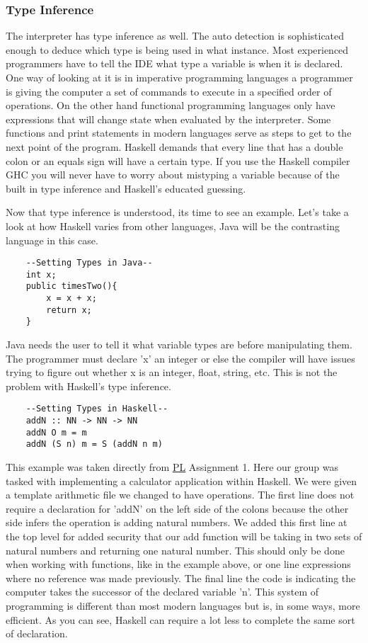 \documentclass{article}
\begin{document}
    \subsubsection{Type Inference}
    The interpreter has type inference as well. The auto detection is sophisticated enough to deduce which type is being used in what instance. Most experienced programmers have to tell the IDE what type a variable is when it is declared. One way of looking at it is in imperative programming languages a programmer is giving the computer a set of commands to execute in a specified order of operations. On the other hand functional programming languages only have expressions that will change state when evaluated by the interpreter. Some functions and print statements in modern languages serve as steps to get to the next point of the program. Haskell demands that every line that has a double colon or an equals sign will have a certain type. If you use the Haskell compiler GHC you will never have to worry about mistyping a variable because of the built in type inference and Haskell's educated guessing. 
    
    \medskip\noindent Now that type inference is understood, its time to see an example. Let's take a look at how Haskell varies from other languages, Java will be the contrasting language in this case.
    \begin{lstlisting}
    --Setting Types in Java--
    int x;
    public timesTwo(){
        x = x + x;
        return x;
    }
    \end{lstlisting}
    
    \medskip
    Java needs the user to tell it what variable types are before manipulating them. The programmer must declare 'x' an integer or else the compiler will have issues trying to figure out whether x is an integer, float, string, etc. This is not the problem with Haskell's type inference.
    
    \begin{lstlisting}
    --Setting Types in Haskell--
    addN :: NN -> NN -> NN
    addN O m = m
    addN (S n) m = S (addN n m)
    \end{lstlisting}
    
    \noindent This example was taken directly from \href{PL}{PL} Assignment 1. Here our group was tasked with implementing a calculator application within Haskell. We were given a template arithmetic file we changed to have operations. The first line does not require a declaration for 'addN' on the left side of the colons because the other side infers the operation is adding natural numbers. We added this first line at the top level for added security that our add function will be taking in two sets of natural numbers and returning one natural number. This should only be done when working with functions, like in the example above, or one line expressions where no reference was made previously. The final line the code is indicating the computer takes the successor of the declared variable 'n'. This system of programming is different than most modern languages but is, in some ways, more efficient. As you can see, Haskell can require a lot less to complete the same sort of declaration.
    
\end{document}
